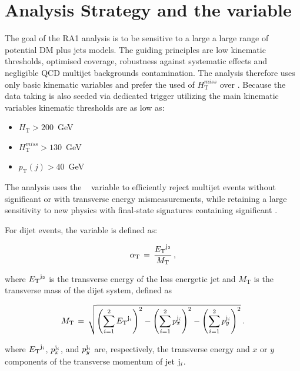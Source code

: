 \section{Analysis Strategy and the \alphat variable}

The goal of the RA1 analysis is to be sensitive to a large a large range of potential DM plus jets models. The guiding principles are low kinematic thresholds, optimised coverage, robustness against systematic effects  and negligible QCD multijet backgrounds contamination. The analysis therefore uses only basic kinematic variables and prefer the used of $H^{miss}_\textrm{T}$ over \etmiss. Because the data taking is also seeded via dedicated trigger utilizing the main kinematic variables kinematic thresholds are as low as:

\begin{itemize}
   \item  $H_\textrm{T}>200$~GeV
   \item  $H^{miss}_\textrm{T}>130$~GeV
   \item  $p_\textrm{T}(j)>40$~GeV
\end{itemize}

The analysis uses the \alphat~\cite{Randall:2008rw, CMS:2008vya, CMS-PAS-SUS-09-001} variable to
 efficiently reject multijet events without significant \met or with transverse energy mismeasurements, 
while retaining a large sensitivity to new physics with final-state signatures containing significant \met.

For dijet events, the \alphat variable is defined as:

\begin{equation}
\label{eq:alphat}
\alpha_{\text{T}}\, =\, \frac{{E_{\text T}}^{{\rm j}_2}}{M_\text{T}} \, ,
\end{equation}

where ${E_{\text T}}^{\rm j_2}$ is the transverse energy of the less energetic
jet and $M_\text{T}$ is the transverse mass of the dijet system,
defined as

\begin{equation}
  \label{eq:mt}
  M_\text{T}\, = \,\sqrt{ \left( \sum_{i=1}^2 {E_{\text T}}^{{\rm j}_i}
    \right)^2 - \left( \sum_{i=1}^2 p_x^{{\rm j}_i} \right)^2 - \left(
      \sum_{i=1}^2 p_y^{{\rm j}_i} \right)^2} \, .
\end{equation}

where ${E_{\text T}}^{{\rm j}_i}$, $p_x^{{\rm j}_i}$, and $p_y^{{\rm j}_i}$ are,
respectively, the transverse energy and $x$ or $y$ components of the
transverse momentum of jet ${\rm j}_i$.

